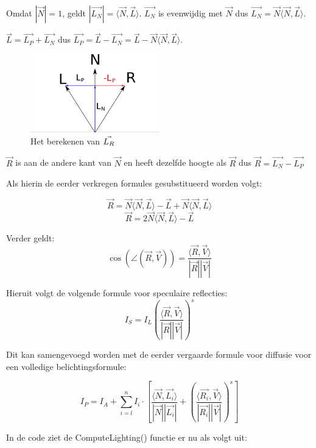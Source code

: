 \documentclass[12pt, a4paper]{article}
\begin{document}
Omdat $\left|\vec{N}\right| = 1$, geldt $\left|\vec{L_N}\right|=\langle\vec{N},\vec{L}\rangle$. $\vec{L_N}$ is evenwijdig met $\vec{N}$ dus $\vec{L_N}=\vec{N}\langle\vec{N},\vec{L}\rangle$.

$\vec{L}=\vec{L_P}+\vec{L_N}$ dus $\vec{L_P}=\vec{L}-\vec{L_N}=\vec{L}-\vec{N}\langle\vec{N},\vec{L}\rangle$.

\begin{figure}[H]
    \centering
    \includegraphics[width=0.50\textwidth]{LR_Calculation.png}
    \caption{Het berekenen van $\protect\vec{L_R}$}
    \label{fig:LR_Calculation}
\end{figure}

$\vec{R}$ is aan de andere kant van $\vec{N}$ en heeft dezelfde hoogte als $\vec{R}$ dus $\vec{R}=\vec{L_N}-\vec{L_P}$

Als hierin de eerder verkregen formules gesubstitueerd worden volgt:

\[\vec{R}=\vec{N}\langle\vec{N},\vec{L}\rangle-\vec{L}+\vec{N}\langle\vec{N},\vec{L}\rangle\]
\[\vec{R}=2\vec{N}\langle\vec{N},\vec{L}\rangle-\vec{L}\]

Verder geldt:
\[\cos\left(\angle\left(\vec{R}, \vec{V}\right)\right)=\frac{\langle\vec{R},\vec{V}\rangle}{\left|\vec{R}\right|\left|\vec{V}\right|}\]

Hieruit volgt de volgende formule voor speculaire reflecties:
\[I_S=I_L\left(\frac{\langle\vec{R},\vec{V}\rangle}{\left|\vec{R}\right|\left|\vec{V}\right|}\right)^s\]

Dit kan samengevoegd worden met de eerder vergaarde formule voor diffusie voor een volledige belichtingsformule:

\[
I_P=
I_A+
\sum_{i=l}^{n}I_i\cdot\left[
\frac{\langle \vec{N}, \vec{L_i} \rangle}{|\vec{N}||\vec{L_i}|}+
\left(\frac{\langle\vec{R_i},\vec{V}\rangle}{\left|\vec{R_i}\right|\left|\vec{V}\right|}\right)^s\right]
\]

In de code ziet de ComputeLighting() functie er nu als volgt uit:
\end{document}
